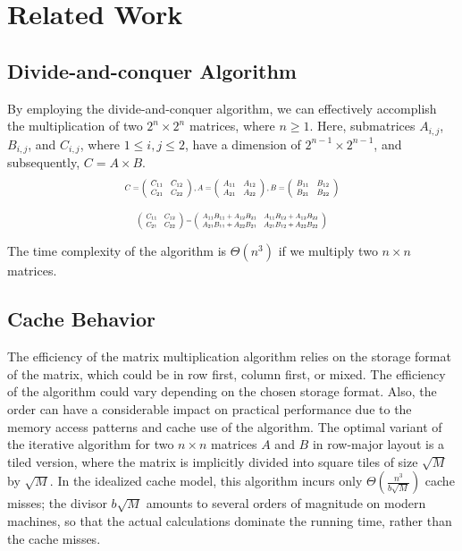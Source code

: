 \documentclass[conference]{IEEEtran}
\begin{document}
	\section{Related Work}
	\subsection{Divide-and-conquer Algorithm}
	By employing the divide-and-conquer algorithm, we can effectively accomplish the multiplication of two $2^n \times 2 ^ n$ matrices, where $n \geq 1$. Here, submatrices $A_{i,j}$, $B_{i,j}$, and $C_{i,j}$, where $1 \leq i,j \leq 2$, have a dimension of $2^{n - 1} \times 2^{n - 1}$, and subsequently, $C = A \times B$. \cite{b1}
	\begin{equation}\nonumber
		\resizebox{0.5\textwidth}{!}{$C=\left(\begin{array}{ll}C_{11} & C_{12} \\ C_{21} & C_{22}\end{array}\right), A=\left(\begin{array}{ll}A_{11} & A_{12} \\ A_{21} & A_{22}\end{array}\right), B=\left(\begin{array}{ll}B_{11} & B_{12} \\ B_{21} & B_{22}\end{array}\right)$}
	\end{equation}

	
	\begin{equation}
		\resizebox{0.44\textwidth}{!}{$\left(\begin{array}{ll}C_{11} & C_{12} \\ C_{21} & C_{22}\end{array}\right)=\left(\begin{array}{ll}A_{11} B_{11}+A_{12} B_{21} & A_{11} B_{12}+A_{12} B_{22} \\ A_{21} B_{11}+A_{22} B_{21} & A_{21} B_{12}+A_{22} B_{22}\end{array}\right)$}
	\end{equation}

	
	The time complexity of the algorithm is $\Theta(n^3)$ if we multiply two $n \times n $ matrices.
	\subsection{Cache Behavior}
	The efficiency of the matrix multiplication algorithm relies on the storage format of the matrix, which could be in row first, column first, or mixed. The efficiency of the algorithm could vary depending on the chosen storage format. Also, the order can have a considerable impact on practical performance due to the memory access patterns and cache use of the algorithm.\cite{b2} The optimal variant of the iterative algorithm for two $n \times n$ matrices $A$ and $B$ in row-major layout is a tiled version, where the matrix is implicitly divided into square tiles of size $\sqrt{M}$ by $\sqrt{M}$. \cite{b3} In the idealized cache model, this algorithm incurs only $ \Theta(\frac{n^3}{b\sqrt{M}})$ cache misses; the divisor $b\sqrt{M}$ amounts to several orders of magnitude on modern machines, so that the actual calculations dominate the running time, rather than the cache misses.
\end{document}
